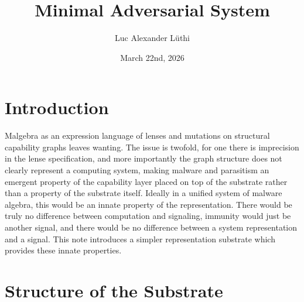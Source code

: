 \documentclass{article}
\title{Minimal Adversarial System}
\author{Luc Alexander L{\"u}thi}
\date{March 22nd, 2026}
\begin{document}
	\maketitle
	\tableofcontents
	\section{Introduction}
	Malgebra as an expression language of lenses and mutations on structural capability graphs leaves wanting. The issue is twofold, for one there is imprecision in the lense specification, and more importantly the graph structure does not clearly represent a computing system, making malware and parasitism an emergent property of the capability layer placed on top of the substrate rather than a property of the substrate itself. Ideally in a unified system of malware algebra, this would be an innate property of the representation. There would be truly no difference between computation and signaling, immunity would just be another signal, and there would be no difference between a system representation and a signal. This note introduces a simpler representation substrate which provides these innate properties.
	\section{Structure of the Substrate}
\end{document}

